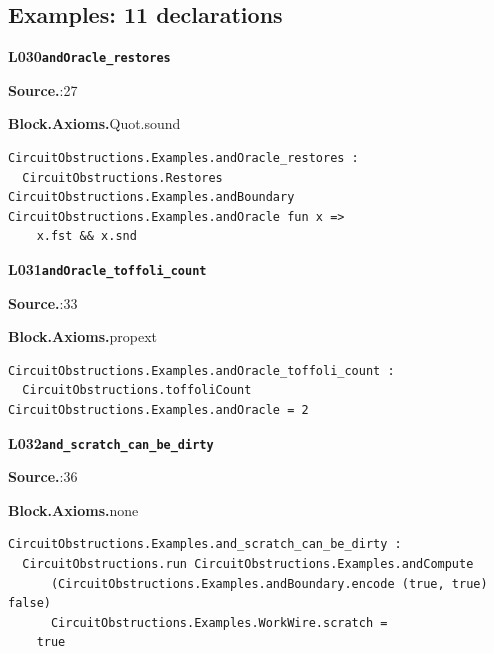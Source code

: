 \subsection*{Examples: 11 declarations}
\par\medskip\noindent\begin{minipage}{\textwidth}
{\small\bfseries L030\enspace\texttt{andOracle\_restores}\par}
{\footnotesize\raggedright\textbf{Source.}\enspace{}:27\par
\textbf{Block.}\quad\textbf{Axioms.}\enspace Quot.sound\par}\nopagebreak
\begin{lstlisting}
CircuitObstructions.Examples.andOracle_restores :
  CircuitObstructions.Restores CircuitObstructions.Examples.andBoundary CircuitObstructions.Examples.andOracle fun x =>
    x.fst && x.snd
\end{lstlisting}
\end{minipage}\par

\par\medskip\noindent\begin{minipage}{\textwidth}
{\small\bfseries L031\enspace\texttt{andOracle\_toffoli\_count}\par}
{\footnotesize\raggedright\textbf{Source.}\enspace{}:33\par
\textbf{Block.}\quad\textbf{Axioms.}\enspace propext\par}\nopagebreak
\begin{lstlisting}
CircuitObstructions.Examples.andOracle_toffoli_count :
  CircuitObstructions.toffoliCount CircuitObstructions.Examples.andOracle = 2
\end{lstlisting}
\end{minipage}\par

\par\medskip\noindent\begin{minipage}{\textwidth}
{\small\bfseries L032\enspace\texttt{and\_scratch\_can\_be\_dirty}\par}
{\footnotesize\raggedright\textbf{Source.}\enspace{}:36\par
\textbf{Block.}\quad\textbf{Axioms.}\enspace none\par}\nopagebreak
\begin{lstlisting}
CircuitObstructions.Examples.and_scratch_can_be_dirty :
  CircuitObstructions.run CircuitObstructions.Examples.andCompute
      (CircuitObstructions.Examples.andBoundary.encode (true, true) false)
      CircuitObstructions.Examples.WorkWire.scratch =
    true
\end{lstlisting}
\end{minipage}\par

